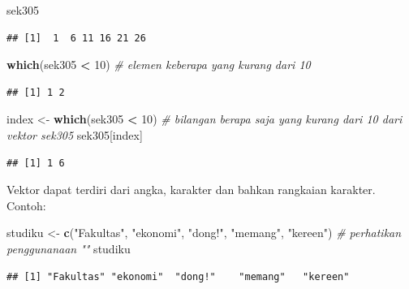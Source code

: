 \documentclass[a4paper, nobind]{templates/ociamthesis}
\newenvironment{Shaded}{\begin{snugshade}}{\end{snugshade}}
\newcommand{\CommentTok}[1]{\textcolor[rgb]{0.56,0.35,0.01}{\textit{#1}}}
\newcommand{\DecValTok}[1]{\textcolor[rgb]{0.00,0.00,0.81}{#1}}
\newcommand{\FunctionTok}[1]{\textcolor[rgb]{0.13,0.29,0.53}{\textbf{#1}}}
\newcommand{\NormalTok}[1]{#1}
\newcommand{\OtherTok}[1]{\textcolor[rgb]{0.56,0.35,0.01}{#1}}
\newcommand{\SpecialCharTok}[1]{\textcolor[rgb]{0.81,0.36,0.00}{\textbf{#1}}}
\newcommand{\StringTok}[1]{\textcolor[rgb]{0.31,0.60,0.02}{#1}}
\renewenvironment{Shaded}
{
  \vspace{10pt}%
  \begin{snugshade}%
}{%
  \end{snugshade}%
  \vspace{8pt}%
}
\begin{document}
\begin{Shaded}
\begin{Highlighting}[]
\NormalTok{sek305}
\end{Highlighting}
\end{Shaded}

\begin{verbatim}
## [1]  1  6 11 16 21 26
\end{verbatim}

\begin{Shaded}
\begin{Highlighting}[]
\FunctionTok{which}\NormalTok{(sek305 }\SpecialCharTok{\textless{}} \DecValTok{10}\NormalTok{) }\CommentTok{\# elemen keberapa yang kurang dari 10}
\end{Highlighting}
\end{Shaded}

\begin{verbatim}
## [1] 1 2
\end{verbatim}

\begin{Shaded}
\begin{Highlighting}[]
\NormalTok{index }\OtherTok{\textless{}{-}} \FunctionTok{which}\NormalTok{(sek305 }\SpecialCharTok{\textless{}} \DecValTok{10}\NormalTok{) }\CommentTok{\# bilangan berapa saja yang kurang dari 10 dari vektor sek305 }
\NormalTok{sek305[index]}
\end{Highlighting}
\end{Shaded}

\begin{verbatim}
## [1] 1 6
\end{verbatim}

Vektor dapat terdiri dari angka, karakter dan bahkan rangkaian karakter. Contoh:

\begin{Shaded}
\begin{Highlighting}[]
\NormalTok{studiku }\OtherTok{\textless{}{-}} \FunctionTok{c}\NormalTok{(}\StringTok{"Fakultas"}\NormalTok{, }\StringTok{"ekonomi"}\NormalTok{, }\StringTok{"dong!"}\NormalTok{, }\StringTok{"memang"}\NormalTok{, }\StringTok{"kereen"}\NormalTok{) }\CommentTok{\# perhatikan penggunanaan ""}
\NormalTok{studiku}
\end{Highlighting}
\end{Shaded}

\begin{verbatim}
## [1] "Fakultas" "ekonomi"  "dong!"    "memang"   "kereen"
\end{verbatim}
\end{document}
